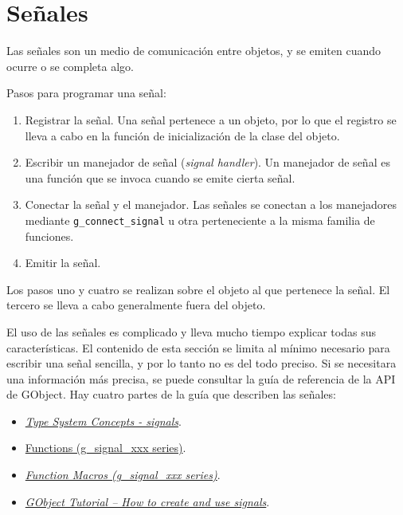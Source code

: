 %

\section{Señales}
Las señales son un medio de comunicación entre objetos, y se emiten cuando ocurre o se completa algo.

Pasos para programar una señal:
\begin{enumerate}
  \tightlist
\item Registrar la señal. Una señal pertenece a un objeto, por lo que el registro se lleva a cabo en la
  función de inicialización de la clase del objeto.
\item Escribir un manejador de señal (\emph{signal handler}). Un manejador de señal es una función
  que se invoca cuando se emite cierta señal.
\item Conectar la señal y el manejador. Las señales se conectan a los manejadores mediante
  \texttt{g\_connect\_signal} u otra perteneciente a la misma familia de funciones.
  \item Emitir la señal.
  \end{enumerate}

  Los pasos uno y cuatro se realizan sobre el objeto al que pertenece la señal. El tercero se lleva a cabo
  generalmente fuera del objeto.

  El uso de las señales es complicado y lleva mucho tiempo explicar todas sus características. El contenido
  de esta sección se limita al mínimo necesario para escribir una señal sencilla, y por lo tanto no es del todo
  preciso. Si se necesitara una información más precisa, se puede consultar la guía de referencia de la
  API de \textsf{GObject}. Hay cuatro partes de la guía que describen las señales:
  \begin{itemize}
    \tightlist
  \item \href{https://docs.gtk.org/gobject/concepts.html#signals}
    {\emph{\textsf{Type System Concepts - signals}}}.
  \item \href{https://docs.gtk.org/gobject/#functions}
    {\textsf{Functions (g\_signal\_xxx  series)}}.
  \item   \href{https://docs.gtk.org/gobject/#function_macros}
    {\emph{\textsf{Function Macros (g\_signal\_xxx series)}}}.
  \item   \href{https://docs.gtk.org/gobject/tutorial.html#how-to-create-and-use-signals}
    {\emph{\textsf{GObject Tutorial -- How to create and use signals}}}.
\end{itemize}

